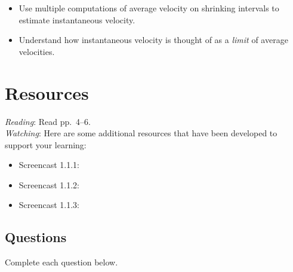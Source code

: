 \documentclass{ximera}
\begin{document}
\begin{itemize}
	\item Use multiple computations of average velocity on shrinking intervals to estimate instantaneous velocity.
	\item Understand how instantaneous velocity is thought of as a \emph{limit} of average velocities. 
\end{itemize}

\section{Resources}

\noindent
\emph{Reading}: Read pp.~4--6. \\

\noindent
\emph{Watching}: Here are some additional resources that have been developed to support your learning: 

\begin{itemize}
	\item Screencast 1.1.1: 
	\item Screencast 1.1.2: 
	\item Screencast 1.1.3: 
\end{itemize}

\subsection*{Questions}

\noindent Complete each question below.  
\end{document}
